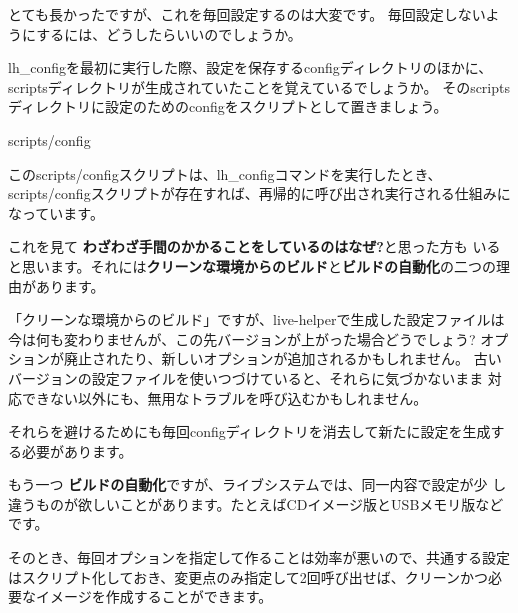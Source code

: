 \documentclass[mingoth,a4paper]{jsarticle}
\begin{document}
\newpage

とても長かったですが、これを毎回設定するのは大変です。
毎回設定しないようにするには、どうしたらいいのでしょうか。

lh\_configを最初に実行した際、設定を保存するconfigディレクトリのほかに、
scriptsディレクトリが生成されていたことを覚えているでしょうか。
そのscriptsディレクトリに設定のためのconfigをスクリプトとして置きましょう。

scripts/config



このscripts/configスクリプトは、lh\_configコマンドを実行したとき、scripts/configスクリプトが存在すれば、再帰的に呼び出され実行される仕組みになっています。

これを見て {\bf わざわざ手間のかかることをしているのはなぜ?}と思った方も
いると思います。それには{\bf クリーンな環境からのビルド}と{\bf ビルドの自動化}の二つの理由があります。

「クリーンな環境からのビルド」ですが、live-helperで生成した設定ファイルは
今は何も変わりませんが、この先バージョンが上がった場合どうでしょう?
オプションが廃止されたり、新しいオプションが追加されるかもしれません。
古いバージョンの設定ファイルを使いつづけていると、それらに気づかないまま
対応できない以外にも、無用なトラブルを呼び込むかもしれません。

それらを避けるためにも毎回configディレクトリを消去して新たに設定を生成す
る必要があります。

もう一つ {\bf ビルドの自動化}ですが、ライブシステムでは、同一内容で設定が少
し違うものが欲しいことがあります。たとえばCDイメージ版とUSBメモリ版など
です。

そのとき、毎回オプションを指定して作ることは効率が悪いので、共通する設定はスクリプト化しておき、変更点のみ指定して2回呼び出せば、クリーンかつ必要なイメージを作成することができます。
\end{document}
